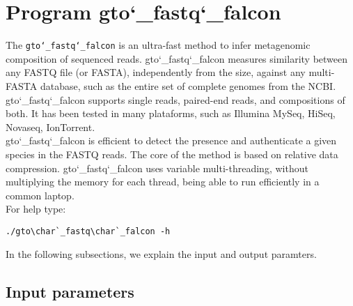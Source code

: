 \section{Program gto\char`_fastq\char`_falcon}
The \texttt{gto\char`_fastq\char`_falcon} is an ultra-fast method to infer metagenomic composition of sequenced reads. gto\char`_fastq\char`_falcon measures similarity between any FASTQ file (or FASTA), independently from the size, against any multi-FASTA database, such as the entire set of complete genomes from the NCBI. gto\char`_fastq\char`_falcon supports single reads, paired-end reads, and compositions of both. It has been tested in many plataforms, such as Illumina MySeq, HiSeq, Novaseq, IonTorrent.\\
gto\char`_fastq\char`_falcon is efficient to detect the presence and authenticate a given species in the FASTQ reads. The core of the method is based on relative data compression. gto\char`_fastq\char`_falcon uses variable multi-threading, without multiplying the memory for each thread, being able to run efficiently in a common laptop.\\
For help type:
\begin{lstlisting}
./gto\char`_fastq\char`_falcon -h
\end{lstlisting}
In the following subsections, we explain the input and output paramters.

\subsection*{Input parameters}

